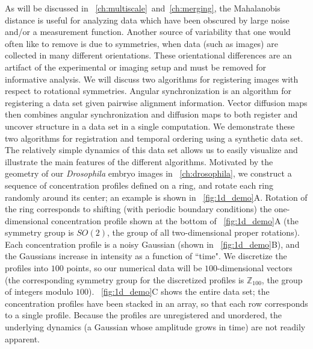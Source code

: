 As will be discussed in \chap~\ref{ch:multiscale}~and~\ref{ch:merging}, the Mahalanobis distance is useful for analyzing data which have been obscured by large noise and/or a measurement function. 
%
Another source of variability that one would often like to remove is due to symmetries, when data (such as images) are collected in many different orientations. 
%
These orientational differences are an artifact of the experimental or imaging setup and must be removed for informative analysis.
%
We will discuss two algorithms for registering images with respect to rotational symmetries. 
%
Angular synchronization \cite{singer2011angular} is an algorithm for registering a data set given pairwise alignment information. 
%
Vector diffusion maps \cite{singer2012vector} then combines angular synchronization and diffusion maps to both register and uncover structure in a data set in a single computation. 
%
We demonstrate these two algorithms for registration and temporal ordering using a synthetic data set.
%
The relatively simple dynamics of this data set allows us to easily visualize and illustrate the main features of the different algorithms.
%
Motivated by the geometry of our {\em Drosophila} embryo images in \chap~\ref{ch:drosophila}, we construct a sequence of concentration profiles defined on a ring, and rotate each ring randomly around its center; an example is shown in \fig~\ref{fig:1d_demo}A.
%
Rotation of the ring corresponds to shifting (with periodic boundary conditions) the one-dimensional concentration profile shown at the bottom of \fig~\ref{fig:1d_demo}A (the symmetry group is $SO(2)$, the group of all two-dimensional proper rotations).
%
Each concentration profile is a noisy Gaussian (shown in \fig~\ref{fig:1d_demo}B), and the Gaussians increase in intensity as a function of ``time".
%
We discretize the profiles into $100$ points, so our numerical data will be $100$-dimensional vectors (the corresponding symmetry group for the discretized profiles is $\mathbb{Z}_{100}$, the group of integers modulo $100$).
%
\fig~\ref{fig:1d_demo}C shows the entire data set; the concentration profiles have been stacked in an array, so that each row corresponds to a single profile.
%
Because the profiles are unregistered and unordered, the underlying dynamics (a Gaussian whose amplitude grows in time) are not readily apparent.

